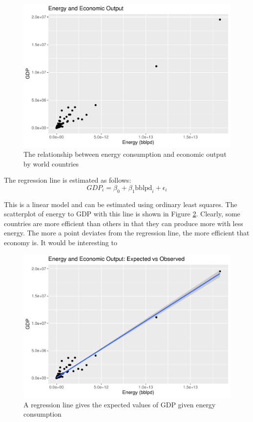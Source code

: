 \documentclass[]{elsarticle} %
\makeatletter
\def\maxwidth{\ifdim\Gin@nat@width>\linewidth\linewidth
\else\Gin@nat@width\fi}
\let\Oldincludegraphics\includegraphics
\renewcommand{\includegraphics}[1]{\Oldincludegraphics[width=\maxwidth]{#1}}
\makeatother
\begin{document}
\begin{figure}
\centering
\includegraphics{Elsevier-Template_files/figure-latex/fig-energy-to-gdp-1.pdf}
\caption{\label{fig:energy-to-gdp} The relationship between energy
consumption and economic output by world countries}
\end{figure}

The regression line is estimated as follows: \[
GDP_i = \beta_0 + \beta_1\text{bblpd}_i + \epsilon_i
\]

This is a linear model and can be estimated using ordinary least
squares. The scatterplot of energy to GDP with this line is shown in
Figure \ref{fig:energy-to-gdp-with-line}. Clearly, some countries are
more efficient than others in that they can produce more with less
energy. The more a point deviates from the regression line, the more
efficient that economy is. It would be interesting to

\begin{figure}
\centering
\includegraphics{Elsevier-Template_files/figure-latex/fig-energy-to-gdp-with-line-1.pdf}
\caption{\label{fig:energy-to-gdp-with-line} A regression line gives the
expected values of GDP given energy consumption}
\end{figure}
\end{document}
